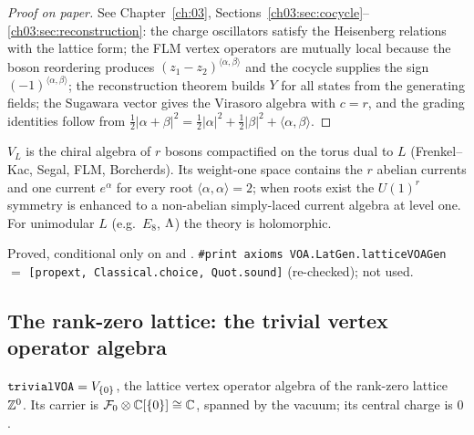 \begin{proof}[Proof on paper]
See Chapter~\ref{ch:03}, Sections~\ref{ch03:sec:cocycle}--\ref{ch03:sec:reconstruction}: the charge oscillators
satisfy the Heisenberg relations with the lattice form; the FLM vertex operators are mutually local because the
boson reordering produces $(z_1-z_2)^{\langle\alpha,\beta\rangle}$ and the cocycle supplies the sign
$(-1)^{\langle\alpha,\beta\rangle}$; the reconstruction theorem builds $Y$ for all states from the generating fields;
the Sugawara vector gives the Virasoro algebra with $c=r$, and the grading identities follow from
$\frac12|\alpha+\beta|^2=\frac12|\alpha|^2+\frac12|\beta|^2+\langle\alpha,\beta\rangle$.
\end{proof}

\begin{physics}
$V_L$ is the chiral algebra of $r$ bosons compactified on the torus dual to $L$ (Frenkel--Kac, Segal, FLM,
Borcherds). Its weight-one space contains the $r$ abelian currents and one current $e^\alpha$ for every root
$\langle\alpha,\alpha\rangle=2$; when roots exist the $U(1)^r$ symmetry is enhanced to a non-abelian simply-laced current
algebra at level one. For unimodular $L$ (e.g.\ $E_8$, ${\Lambda}$) the theory is holomorphic.
\end{physics}

\begin{status}
Proved, conditional only on  and . \texttt{\#print axioms VOA.LatGen.latticeVOAGen} $=$
\texttt{[propext, Classical.choice, Quot.sound]} (re-checked);  not used.
\end{status}

\subsection{The rank-zero lattice: the trivial vertex operator algebra}\label{l05:sec:trivial}

\begin{definition}\label{l05:def:trivial}
$\lean{trivialVOA}=V_{\{0\}}$, the lattice vertex operator algebra of the rank-zero lattice ${\mathbb{Z}}^0$. Its carrier is
$\mathcal{F}_0\otimes{\mathbb{C}}[\{0\}]\cong{\mathbb{C}}$, spanned by the vacuum; its central charge is $0$.
\end{definition}

